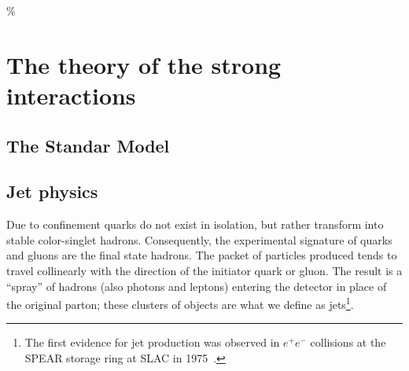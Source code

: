 \%
%
%
\chapter{The theory of the strong interactions}

\section{The Standar Model}\label{sec:qcdintro}




\section{Jet physics}\label{sec:jets}


Due to confinement quarks do not exist in isolation, but rather transform into stable color-singlet hadrons. Consequently, the experimental signature of quarks and gluons are the final state hadrons. The packet of particles produced tends to travel collinearly with the direction of the initiator quark or gluon. The result is a ``spray'' of hadrons (also photons and leptons) entering the detector in place of the original parton; these clusters of objects are what we define as jets\footnote{The first evidence for jet production was observed in $e^+e^-$ collisions at the SPEAR storage ring at SLAC in 1975~\cite{PhysRevLett.35.1609}.}.

